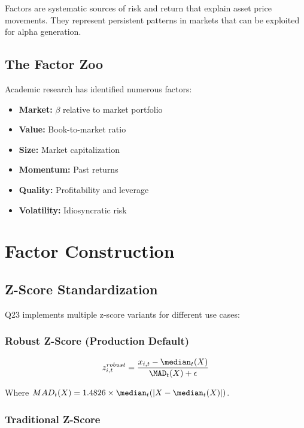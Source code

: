 \documentclass[11pt,letterpaper]{book}
\begin{document}
Factors are systematic sources of risk and return that explain asset price movements. They represent persistent patterns in markets that can be exploited for alpha generation.

\subsection{The Factor Zoo}

Academic research has identified numerous factors:

\begin{itemize}
    \item \textbf{Market:} $\beta$ relative to market portfolio
    \item \textbf{Value:} Book-to-market ratio
    \item \textbf{Size:} Market capitalization
    \item \textbf{Momentum:} Past returns
    \item \textbf{Quality:} Profitability and leverage
    \item \textbf{Volatility:} Idiosyncratic risk
\end{itemize}

\section{Factor Construction}

\subsection{Z-Score Standardization}

Q23 implements multiple z-score variants for different use cases:

\subsubsection{Robust Z-Score (Production Default)}

\begin{equation}
z_{i,t}^{robust} = \frac{x_{i,t} - \median_t(X)}{\MAD_t(X) + \epsilon}
\end{equation}

Where $MAD_t(X) = 1.4826 \times \median_t(|X - \median_t(X)|)$.

\subsubsection{Traditional Z-Score}
\end{document}
